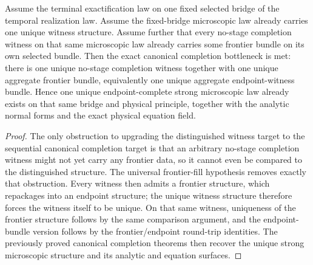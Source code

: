 \begin{theorem}
\label{thm:canonical-flagship-witness-target-plus-universal-frontier-fill-implies-canonical-completion-bundle-target}
Assume the terminal exactification law on one fixed selected bridge of the
temporal realization law. Assume the fixed-bridge microscopic law already
carries one unique witness structure. Assume further that every
no-stage completion witness on that same microscopic law already
carries some frontier bundle on its own selected bundle. Then the
exact canonical completion bottleneck is met: there is one unique no-stage
completion witness together with one unique aggregate frontier bundle,
equivalently one unique aggregate endpoint-witness bundle. Hence one
unique endpoint-complete strong microscopic law already exists on that same
bridge and physical principle, together with the analytic normal forms and
the exact physical equation field.
\end{theorem}

\begin{proof}
The only obstruction to upgrading the distinguished witness
target to the sequential canonical completion target is that an arbitrary
no-stage completion witness might not yet carry any frontier data, so
it cannot even be compared to the distinguished structure. The universal
frontier-fill hypothesis removes exactly that obstruction. Every witness then
admits a frontier structure, which repackages into an endpoint structure; the
unique witness structure therefore forces the witness itself to be
unique. On that same witness, uniqueness of the frontier structure follows by the
same comparison argument, and the endpoint-bundle version follows by the
frontier/endpoint round-trip identities. The previously proved canonical
completion theorems then recover the unique strong microscopic structure and its
analytic and equation surfaces.
\end{proof}

